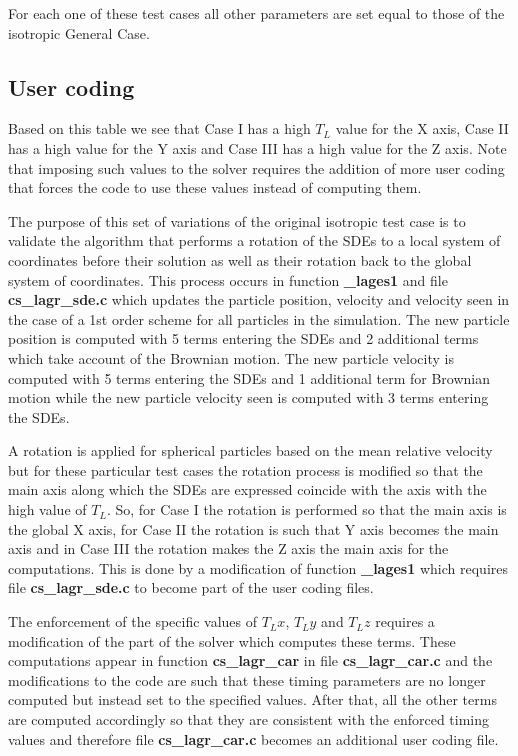 For each one of these test cases all other parameters are set equal to those of the isotropic General Case.

\subsection{User coding}
Based on this table we see that Case I has a high $T_L$ value for the X axis, Case II has a high value for the Y axis and Case III has a high value for the Z axis. Note that imposing such values to the solver requires the addition of more user coding that forces the code to use these values instead of computing them.

The purpose of this set of variations of the original isotropic test case is to validate the algorithm that performs a rotation of the SDEs to a local system of coordinates before their solution as well as their rotation back to the global system of coordinates. This process occurs in function \textbf{\_lages1} and file \textbf{cs\_lagr\_sde.c} which updates the particle position, velocity and velocity seen in the case of a 1st order scheme for all particles in the simulation. The new particle position is computed with 5 terms entering the SDEs and 2 additional terms which take account of the Brownian motion. The new particle velocity is computed with 5 terms entering the SDEs and 1 additional term for Brownian motion while the new particle velocity seen is computed with 3 terms entering the SDEs.

A rotation is applied for spherical particles based on the mean relative velocity but for these particular test cases the rotation process is modified so that the main axis along which the SDEs are expressed coincide with the axis with the high value of $T_L$. So, for Case I the rotation is performed so that the main axis is the global X axis, for Case II the rotation is such that Y axis becomes the main axis and in Case III the rotation makes the Z axis the main axis for the computations. This is done by a modification of function \textbf{\_lages1} which requires file \textbf{cs\_lagr\_sde.c} to become part of the user coding files.

The enforcement of the specific values of $T_Lx$, $T_Ly$ and $T_Lz$ requires a modification of the part of the solver which computes these terms. These computations appear in function \textbf{cs\_lagr\_car} in file \textbf{cs\_lagr\_car.c} and the modifications to the code are such that these timing parameters are no longer computed but instead set to the specified values. After that, all the other terms are computed accordingly so that they are consistent with the enforced timing values and therefore file \textbf{cs\_lagr\_car.c} becomes an additional user coding file.

